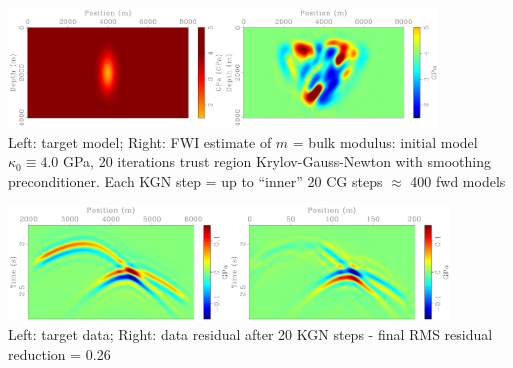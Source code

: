 \documentclass[xcolor=dvipsnames,12pt,aspectratio=169]{beamer}
\begin{document}
\begin{frame}
\begin{center}
\includegraphics[height=1.25in]{Fig/bml0.pdf}\includegraphics[height=1.25in]{Fig/fwitrbulkmodinvlh0.pdf}\\
\vspace{0.5cm}
Left: target model; 
Right: FWI estimate of $m$ = bulk modulus: initial model $\kappa_0 \equiv 4.0$ GPa, 20 iterations trust region Krylov-Gauss-Newton with smoothing preconditioner. Each KGN step =  up to ``inner'' 20 CG steps $\approx$ 400 fwd models
\end{center}
\end{frame}

\begin{frame}
\begin{center}
\includegraphics[height=1.2in]{Fig/ptpwindl0.pdf}\includegraphics[height=1.2in]{Fig/fwitrreslh0wind.pdf}\\
\vspace{0.5cm}
Left: target data; 
Right: data residual after 20 KGN steps - final RMS residual reduction = 0.26
\end{center}
\end{frame}
\end{document}

